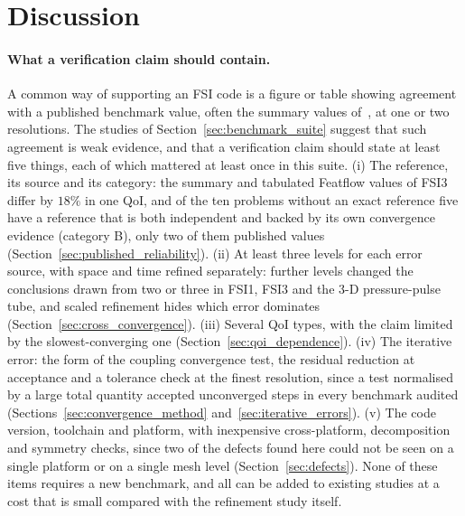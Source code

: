 \section{Discussion}\label{sec:discussion}

\paragraph{What a verification claim should contain.}
A common way of supporting an FSI code is a figure or table showing agreement with a published benchmark value, often the summary values of~\citet{Turek2006}, at one or two resolutions.
The studies of Section~\ref{sec:benchmark_suite} suggest that such agreement is weak evidence, and that a verification claim should state at least five things, each of which mattered at least once in this suite.
(i) The reference, its source and its category: the summary and tabulated Featflow values of FSI3 differ by $18\%$ in one QoI, and of the ten problems without an exact reference five have a reference that is both independent and backed by its own convergence evidence (category B), only two of them published values (Section~\ref{sec:published_reliability}).
(ii) At least three levels for each error source, with space and time refined separately: further levels changed the conclusions drawn from two or three in FSI1, FSI3 and the 3-D pressure-pulse tube, and scaled refinement hides which error dominates (Section~\ref{sec:cross_convergence}).
(iii) Several QoI types, with the claim limited by the slowest-converging one (Section~\ref{sec:qoi_dependence}).
(iv) The iterative error: the form of the coupling convergence test, the residual reduction at acceptance and a tolerance check at the finest resolution, since a test normalised by a large total quantity accepted unconverged steps in every benchmark audited (Sections~\ref{sec:convergence_method} and~\ref{sec:iterative_errors}).
(v) The code version, toolchain and platform, with inexpensive cross-platform, decomposition and symmetry checks, since two of the defects found here could not be seen on a single platform or on a single mesh level (Section~\ref{sec:defects}).
None of these items requires a new benchmark, and all can be added to existing studies at a cost that is small compared with the refinement study itself.

